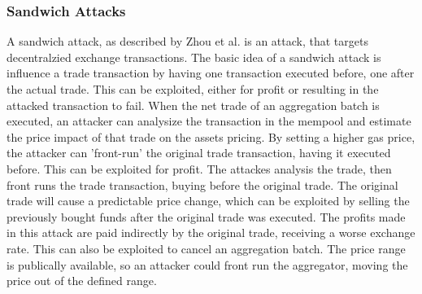 \documentclass[../../thesis.tex]{subfiles}
\begin{document}
\subsubsection{Sandwich Attacks} 
A sandwich attack, as described by Zhou et al. \cite{zhou2020high} is an attack, that targets decentralzied exchange transactions. The basic idea of a sandwich attack is influence a trade transaction by having one transaction executed before, one after the actual trade. This can be exploited, either for profit or resulting in the attacked transaction to fail. When the net trade of an aggregation batch is executed, an attacker can analysize the transaction in the mempool and estimate the price impact of that trade on the assets pricing. By setting a higher gas price, the attacker can 'front-run' \cite{adams2020uniswap} the original trade transaction, having it executed before. This can be exploited for profit. The attackes analysis the trade, then front runs the trade transaction, buying before the original trade. The original trade will cause a predictable price change, which can be exploited by selling the previously bought funds after the original trade was executed. The profits made in this attack are paid indirectly by the original trade, receiving a worse exchange rate. This can also be exploited to cancel an aggregation batch. The price range is publically available, so an attacker could front run the aggregator, moving the price out of the defined range. 
\end{document}
